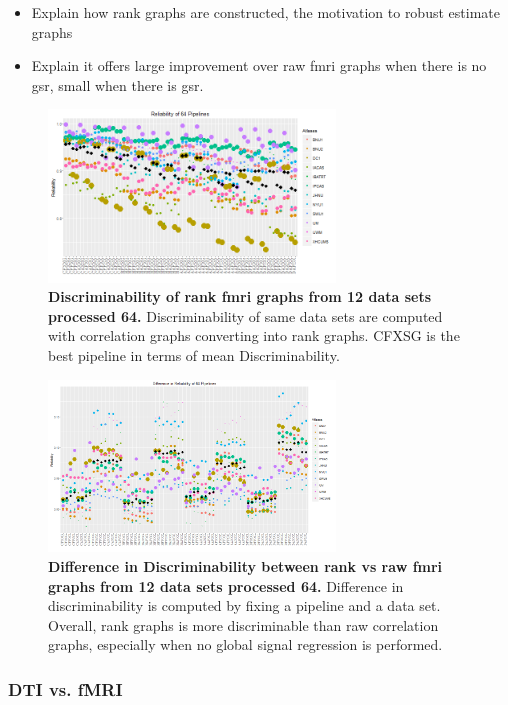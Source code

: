 \documentclass{article}
\begin{document}
\begin{itemize}
	\item Explain how rank graphs are constructed, the motivation to robust estimate graphs
	\item Explain it offers large improvement over raw fmri graphs when there is no gsr, small when there is gsr.
\end{itemize}
\begin{figure}[t!]
	\includegraphics[width=3.0in]{../Figs/64_pipelines_size_rank.png}
	\caption{{\bf Discriminability of rank fmri graphs from 12 data sets processed 64.} Discriminability of same data sets are computed with correlation graphs converting into rank graphs. CFXSG is the best pipeline in terms of mean Discriminability.}
	\label{fig:8}
\end{figure}


\begin{figure}[t!]
	\includegraphics[width=3.0in]{../Figs/64_pipelines_differ.png}
	\caption{{\bf Difference in Discriminability between rank vs raw fmri graphs from 12 data sets processed 64.} Difference in discriminability is computed by fixing a pipeline and a data set. Overall, rank graphs is more discriminable than raw correlation graphs, especially when no global signal regression is performed. }
	\label{fig:9}
\end{figure}




\subsubsection{DTI vs. fMRI}
\end{document}
